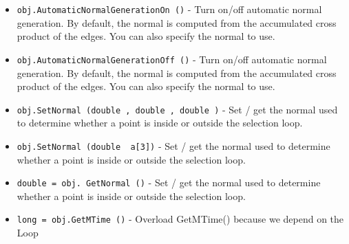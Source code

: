 \begin{itemize}
\item  \verb|obj.AutomaticNormalGenerationOn ()| -  Turn on/off automatic normal generation. By default, the normal is
 computed from the accumulated cross product of the edges. You can also
 specify the normal to use.

\item  \verb|obj.AutomaticNormalGenerationOff ()| -  Turn on/off automatic normal generation. By default, the normal is
 computed from the accumulated cross product of the edges. You can also
 specify the normal to use.

\item  \verb|obj.SetNormal (double , double , double )| -  Set / get the normal used to determine whether a point is inside or outside
 the selection loop.

\item  \verb|obj.SetNormal (double  a[3])| -  Set / get the normal used to determine whether a point is inside or outside
 the selection loop.

\item  \verb|double = obj. GetNormal ()| -  Set / get the normal used to determine whether a point is inside or outside
 the selection loop.

\item  \verb|long = obj.GetMTime ()| -  Overload GetMTime() because we depend on the Loop

\end{itemize}

